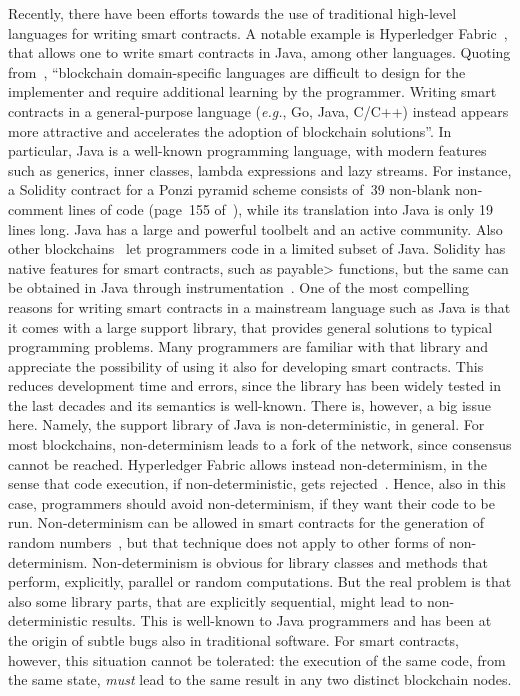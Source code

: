 Recently, there have been efforts towards the use of traditional
high-level languages for writing smart contracts.
A notable example is Hyperledger Fabric~\cite{AndroulakiBBCCC18,Vukolic17}, that allows one
to write smart contracts in Java, among other languages. Quoting from~\cite{AndroulakiBBCCC18},
``blockchain domain-specific languages are difficult to design for the implementer
and require additional learning by the programmer. Writing smart contracts
in a general-purpose language (\emph{e.g.}, Go, Java, C/C++) instead
appears more attractive and accelerates the adoption of blockchain solutions''.
In particular, Java is a well-known programming language,
with modern features such as generics, inner classes, lambda
expressions and lazy streams. For instance, a Solidity contract
for a Ponzi pyramid scheme consists of~39 non-blank non-comment lines of code
(page~155 of~\cite{IyerD18}), while its translation into Java is only 19 lines
long. %
Java has a large and powerful toolbelt and an active community.
Also other blockchains~\cite{aion_example_contract,neo_contract,Spoto19}
let programmers code in a limited subset of Java.
Solidity has native features for smart contracts, such as
\<payable> functions, but the same can be obtained in Java through instrumentation~\cite{Spoto19}.
%
One of the most compelling reasons for writing smart contracts
in a mainstream language such as Java is that it comes with a large
support library, that provides general solutions to typical programming problems.
Many programmers are familiar with that library and appreciate the possibility
of using it also for developing smart contracts. This reduces
development time and errors, since the library has been widely tested
in the last decades and its semantics is well-known. There is, however, a big
issue here. Namely, the support library of Java is non-deterministic, in general.
For most blockchains, non-determinism leads to a fork of the network, since
consensus cannot be reached. Hyperledger Fabric allows instead non-determinism,
in the sense that code execution, if non-deterministic, gets rejected~\cite{Vukolic17}.
Hence, also in this case, programmers should avoid non-determinism, if they want their code to be run.
Non-determinism can be allowed in smart contracts for the generation of random numbers~\cite{ChatterjeeGP19}, but that
technique does not apply to other forms of non-determinism.
%
Non-determinism is obvious for library classes and methods that perform, explicitly,
parallel or random computations. But the real problem is that
also some library parts, that are explicitly sequential, might lead to
non-deterministic results.
This is well-known to Java programmers and has been at the origin of subtle
bugs also in traditional software. For smart contracts, however,
this situation cannot be tolerated: the execution of the same code, from the same state,
\emph{must} lead to the same result in any two distinct blockchain nodes.

